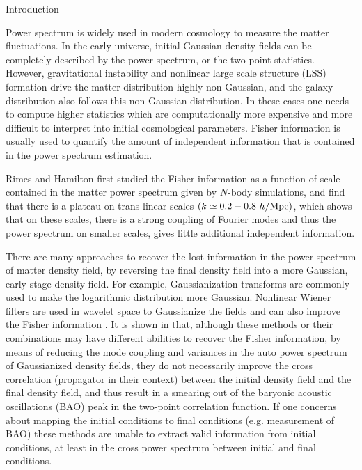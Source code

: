 \begin{section}{Introduction}\label{sec:introduction}  

Power spectrum is widely used in modern cosmology to measure the matter
fluctuations. In the early universe, initial Gaussian density fields
can be completely described by the power spectrum, or the two-point
statistics. However, gravitational instability and nonlinear large scale
structure (LSS) formation drive the matter distribution highly
non-Gaussian, and the galaxy distribution also follows this non-Gaussian
distribution. In these cases one needs to compute higher statistics
which are computationally more expensive and more difficult to
interpret into initial cosmological parameters. Fisher information
is usually used to quantify the amount of independent information
that is contained in the power spectrum estimation.

Rimes and Hamilton \citep{bib:Rimes2006} first studied the Fisher
information as a function of scale contained in the matter power
spectrum given by $N$-body simulations, and find that there is a
plateau on trans-linear scales $(k \simeq 0.2-0.8\ h/{\rm Mpc})$,
which shows that on these scales, there is a strong coupling of
Fourier modes and thus the power spectrum on smaller scales, gives little
additional independent information.

There are many approaches to recover the lost information in the
power spectrum of matter density field, by reversing the final
density field into a more Gaussian, early stage density field.
For example, Gaussianization transforms are commonly used
\cite{bib:Weinberg1992,bib:Mark2009} to make the logarithmic
distribution more Gaussian. Nonlinear Wiener filters are used
in wavelet space to Gaussianize the fields and can also improve
the Fisher information \cite{bib:Zhang2011,bib:Yu2012,bib:HarnoisD2013}.
It is shown in \cite{bib:HarnoisD2013} that, although these methods
or their combinations may have different abilities to recover
the Fisher information, by means of reducing the mode coupling
and variances in the auto power spectrum of Gaussianized
density fields, they do not necessarily improve the cross correlation
(propagator in their context) between the initial density
field and the final density field, and thus result in a smearing
out of the baryonic acoustic oscillations (BAO) peak in the two-point
correlation function. If one concerns about mapping
the initial conditions to final conditions (e.g. measurement of 
BAO) these methods are unable to
extract valid information from initial conditions, at least in
the cross power spectrum between initial and final conditions.


\end{section}
